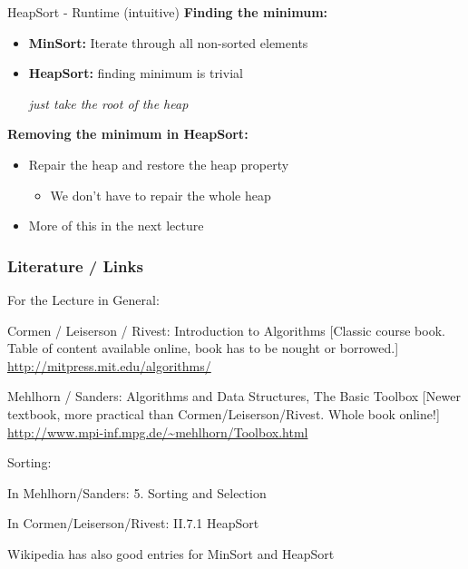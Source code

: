 \documentclass[notes=hide,pdftex,14pt]{beamer}
\begin{document}
\begin{frame}{HeapSort -  Runtime (intuitive)}
  \textbf{Finding the minimum:}
  \begin{itemize}
    \item
      \textbf{MinSort:} Iterate through all non-sorted elements
    \item
      \textbf{HeapSort:} finding minimum is trivial
      \begin{center}
\it{}        just take the root of the heap
      \end{center}
  \end{itemize}
  \vspace*{1.5em}
  \textbf{Removing the minimum in HeapSort:}
  \begin{itemize}
    \item
      Repair the heap and restore the {\color{Mittel-Blau}heap property}
      \begin{itemize}
        \item
          We don't have to repair the whole heap
      \end{itemize}
    \item
      More of this in the next lecture
  \end{itemize}
\end{frame}

\begin{frame}
  \frametitle{Literature / Links}
  \begin{tabl}
  \item For the Lecture in General:
  \eitem
  \begin{tabp}[0.9]
  \item Cormen / Leiserson / Rivest: Introduction to Algorithms
   \sitem\color{DarkGreen} [Classic course book. Table of content  available online, book has to be
  nought or borrowed.]
\sitem \color{DarkBlue}\href{http://mitpress.mit.edu/algorithms/}{\url{http://mitpress.mit.edu/algorithms/}}
\item Mehlhorn / Sanders: Algorithms and Data Structures, The Basic
  Toolbox
  \sitem\color{DarkGreen} [Newer textbook, more practical than
  Cormen/Leiserson/Rivest. Whole book online!]
\sitem \color{DarkBlue}\href{http://www.mpi-inf.mpg.de/~mehlhorn/Toolbox.html}{\url{http://www.mpi-inf.mpg.de/~mehlhorn/Toolbox.html}}
  \end{tabp}
\item Sorting:
  \begin{tabl}
  \item In Mehlhorn/Sanders:   5. Sorting and Selection
  \item In Cormen/Leiserson/Rivest:   II.7.1 HeapSort
  \item Wikipedia has also good entries for MinSort and HeapSort
  \end{tabl}
  \end{tabl}
\end{frame}
\end{document}
